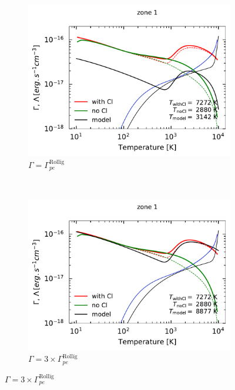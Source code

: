 \begin{figure}[!h]
    \centering
    \begin{subfigure}[t]{0.49\textwidth} %
        \centering \includegraphics[trim = {0 0 0 2 },clip,width=1\textwidth]{figure/Cl/modelPE/GCcomp_Cl_1_1.pdf}
        \caption{$\Gamma =  \Gamma_{pe}^{\mathrm{Rollïg}}$}
    \end{subfigure}
    ~ 
    \begin{subfigure}[t]{0.49\textwidth}
        \centering \includegraphics[trim = {0 0 0 2 },clip,width=1\textwidth]{figure/Cl/modelPE/GCcomp_Cl_1_3.pdf}
        \caption{$\Gamma =  3 \times \Gamma_{pe}^{\mathrm{Rollïg}}$}
    \end{subfigure}

\end{figure}
